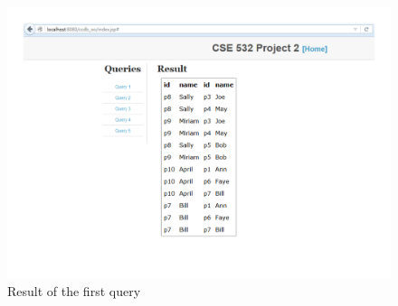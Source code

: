 \documentclass[11pt]{article}
\begin{document}
\begin{figure}[!htp]
\centering
\includegraphics[width=7in]{result.pdf}
\caption{Result of the first query}
\label{fig:resultccdb}
\end{figure}
\end{document}
